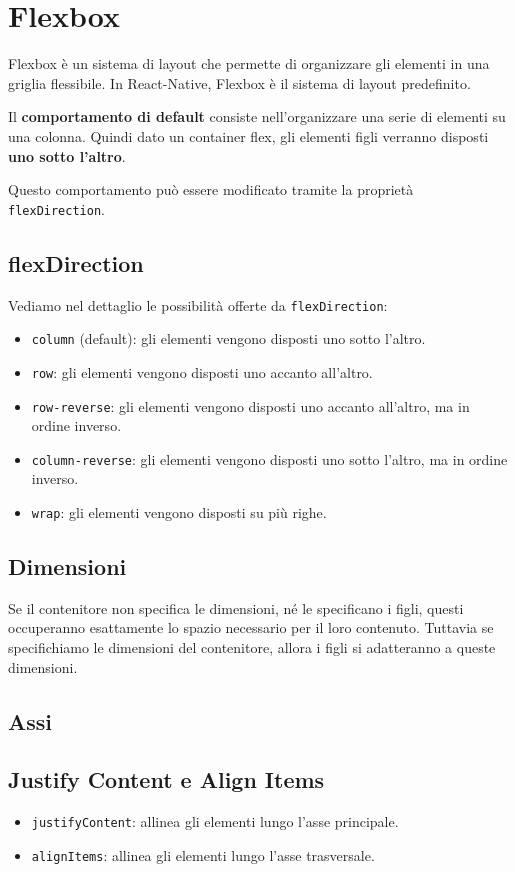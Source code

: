 \documentclass[12pt]{article}
\begin{document}
\section{Flexbox}
Flexbox è un sistema di layout che permette di organizzare gli elementi in una griglia flessibile.
In React-Native, Flexbox è il sistema di layout predefinito.

Il {\bf comportamento di default} consiste nell'organizzare una serie di elementi su 
una colonna. Quindi dato un container flex, gli elementi figli verranno disposti
{\bf uno sotto l'altro}.

Questo comportamento può essere modificato tramite la proprietà \texttt{flexDirection}.

\subsection{flexDirection}
Vediamo nel dettaglio le possibilità offerte da \texttt{flexDirection}:
\begin{itemize}
\item \texttt{column} (default): gli elementi vengono disposti uno sotto l'altro.
\item \texttt{row}: gli elementi vengono disposti uno accanto all'altro.
\item \texttt{row-reverse}: gli elementi vengono disposti uno accanto all'altro, ma in ordine inverso.
\item \texttt{column-reverse}: gli elementi vengono disposti uno sotto l'altro, ma in ordine inverso.
\item \texttt{wrap}: gli elementi vengono disposti su più righe.
\end{itemize}

\subsection{Dimensioni}
Se il contenitore non specifica le dimensioni, né le specificano i figli,
questi occuperanno esattamente lo spazio necessario per il loro contenuto.
Tuttavia se specifichiamo le dimensioni del contenitore, allora i figli
si adatteranno a queste dimensioni.

\subsection{Assi}

\subsection{Justify Content e Align Items}
\begin{itemize}
\item \texttt{justifyContent}: allinea gli elementi lungo l'asse principale.
\item \texttt{alignItems}: allinea gli elementi lungo l'asse trasversale.
\end{itemize}
\end{document}
